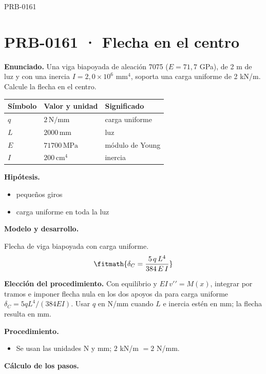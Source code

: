 \begin{studiumworked}{PRB-0161}

\section{PRB-0161 · Flecha en el centro}

\textbf{Enunciado.} Una viga biapoyada de aleación 7075 ($E = 71{,}7$ GPa), de 2 m de luz y con una inercia $I = 2{,}0\times 10^{6}$ mm$^4$, soporta una carga uniforme de 2 kN/m. Calcule la flecha en el centro.

\par\medskip\noindent\begin{tabular}{@{}p{.18\linewidth}p{.26\linewidth}p{.48\linewidth}@{}}
\toprule Símbolo & Valor y unidad & Significado\\\midrule
$q$ & $2\,\mathrm{N/mm}$ & carga uniforme\\
$L$ & $2000\,\mathrm{mm}$ & luz\\
$E$ & $71700\,\mathrm{MPa}$ & módulo de Young\\
$I$ & $200\,\mathrm{cm^4}$ & inercia\\
\bottomrule\end{tabular}\par\medskip

\textbf{Hipótesis.}\begin{itemize}\item pequeños giros
\item carga uniforme en toda la luz\end{itemize}

\textbf{Modelo y desarrollo.}

Flecha de viga biapoyada con carga uniforme.\[\fitmath{\delta_C = \frac{5\,q\,L^{4}}{384\,E\,I}}\]

\textbf{Elección del procedimiento.} Con equilibrio y $EI\,v\prime\prime=M(x)$, integrar por tramos e imponer flecha nula en los dos apoyos da para carga uniforme $\delta_C=5qL^4/(384EI)$. Usar $q$ en N/mm cuando $L$ e inercia estén en mm; la flecha resulta en mm.

\textbf{Procedimiento.}\begin{itemize}\item Se usan las unidades N y mm; $2$ kN/m $= 2$ N/mm.\end{itemize}

\textbf{Cálculo de los pasos.}

\begin{enumerate}


\end{enumerate}
\end{studiumworked}
